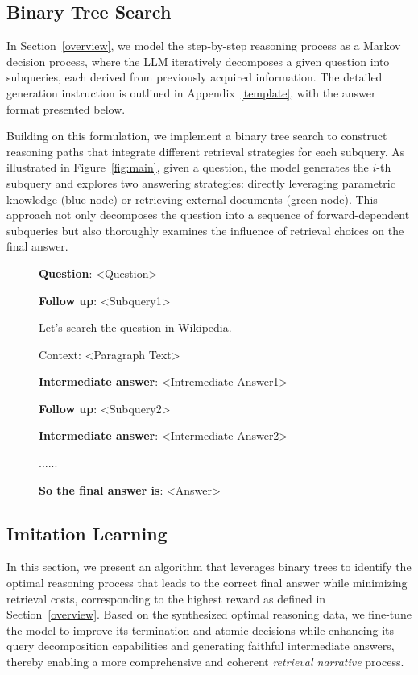 \subsection{Binary Tree Search}

In Section~\ref{overview}, we model the step-by-step reasoning process as a Markov decision process, where the LLM iteratively decomposes a given question into subqueries, each derived from previously acquired information. The detailed generation instruction is outlined in Appendix~\ref{template}, with the answer format presented below.  

Building on this formulation, we implement a binary tree search to construct reasoning paths that integrate different retrieval strategies for each subquery. As illustrated in Figure~\ref{fig:main}, given a question, the model generates the \(i\)-th subquery and explores two answering strategies: directly leveraging parametric knowledge (blue node) or retrieving external documents (green node). This approach not only decomposes the question into a sequence of forward-dependent subqueries but also thoroughly examines the influence of retrieval choices on the final answer.
\begin{figure}[h]
\begin{tcolorbox}[colframe=cyan!40!black,title=\textbf{Answer format}]
\small
\textbf{Question}: <Question>

\textbf{Follow up}: <Subquery1>

Let's search the question in Wikipedia.

Context: <Paragraph Text>

\textbf{Intermediate answer}: <Intremediate Answer1>

\textbf{Follow up}: <Subquery2>

\textbf{Intermediate answer}: <Intermediate Answer2>

......

\textbf{So the final answer is}: <Answer>
\end{tcolorbox}
\end{figure}


\subsection{Imitation Learning}
In this section, we present an algorithm that leverages binary trees to identify the optimal reasoning process that leads to the correct final answer while minimizing retrieval costs, corresponding to the highest reward as defined in Section~\ref{overview}.
% 
Based on the synthesized optimal reasoning data, we fine-tune the model to improve its termination and atomic decisions while enhancing its query decomposition capabilities and generating faithful intermediate answers, thereby enabling a more comprehensive and coherent \textit{retrieval narrative} process.


